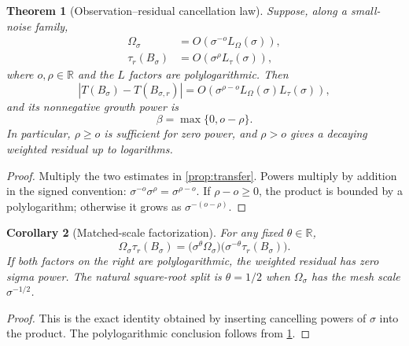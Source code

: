\documentclass[11pt]{article}
\newtheorem{theorem}{Theorem}[section]
\newtheorem{corollary}[theorem]{Corollary}
\theoremstyle{definition}
\theoremstyle{remark}
\begin{document}
\begin{theorem}[Observation--residual cancellation law]
 \label{thm:cancellation}
 Suppose, along a small-noise family,
 \begin{align}
 \Omega_\sigma&=O\!\left(\sigma^{-o}L_\Omega(\sigma)\right),
 \label{eq:omega-power}\\
 \tau_r(B_\sigma)&=O\!\left(\sigma^{\rho}L_\tau(\sigma)\right),
 \label{eq:tau-power}
 \end{align}
 where $o,\rho\in\mathbb R$ and the $L$ factors are polylogarithmic.  Then
 \begin{equation}
 \left|T(B_\sigma)-T(B_{\sigma,r})\right|
 =O\!\left(\sigma^{\rho-o}
 L_\Omega(\sigma)L_\tau(\sigma)\right),
 \label{eq:product-power}
 \end{equation}
 and its nonnegative growth power is
 \begin{equation}
 \boxed{\beta=\max\{0,o-\rho\}.}
 \label{eq:beta}
 \end{equation}
 In particular, $\rho\ge o$ is sufficient for zero power, and $\rho>o$
 gives a decaying weighted residual up to logarithms.
\end{theorem}

\begin{proof}
 Multiply the two estimates in \cref{prop:transfer}.  Powers multiply by
 addition in the signed convention: $\sigma^{-o}\sigma^\rho
 =\sigma^{\rho-o}$.  If $\rho-o\ge0$, the product is bounded by a
 polylogarithm; otherwise it grows as $\sigma^{-(o-\rho)}$.
\end{proof}

\begin{corollary}[Matched-scale factorization]
 \label{cor:matched}
 For any fixed $\theta\in\mathbb R$,
 \begin{equation}
 \Omega_\sigma\tau_r(B_\sigma)
 =\bigl(\sigma^\theta\Omega_\sigma\bigr)
  \bigl(\sigma^{-\theta}\tau_r(B_\sigma)\bigr).
 \label{eq:matched}
 \end{equation}
 If both factors on the right are polylogarithmic, the weighted residual has
 zero sigma power.  The natural square-root split is $\theta=1/2$ when
 $\Omega_\sigma$ has the mesh scale $\sigma^{-1/2}$.
\end{corollary}

\begin{proof}
 This is the exact identity obtained by inserting cancelling powers of
 $\sigma$ into the product.  The polylogarithmic conclusion follows from
 \cref{thm:cancellation}.
\end{proof}
\end{document}
